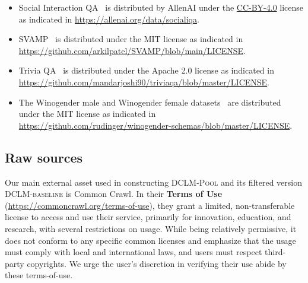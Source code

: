 \documentclass{article}
\newcommand{\rawpool}{\textsc{DCLM-Pool}\xspace}
\newcommand{\hqpool}{\textsc{DCLM-baseline}\xspace}
\newcommand{\commoncrawl}{Common Crawl\xspace}
\begin{document}
\begin{itemize}
    Simple arithmetic with spaces and without spaces~\citep{mosailMLarithmetic} is distributed under the Apache-2.0 through \url{https://github.com/mosaicml/llm-foundry}.
    \item
    Social Interaction QA~\citep{siqa} is distributed by AllenAI under the \href{https://creativecommons.org/licenses/by/4.0/}{CC-BY-4.0} license as indicated in \url{https://allenai.org/data/socialiqa}.
    \item
    SVAMP~\citep{patel2021nlp}  is distributed under the MIT license as indicated in \url{https://github.com/arkilpatel/SVAMP/blob/main/LICENSE}.
    \item
    Trivia QA~\citep{triviaqa} is distributed under the Apache 2.0 license as indicated in \url{https://github.com/mandarjoshi90/triviaqa/blob/master/LICENSE}.
    \item
    The Winogender male and Winogender female datasets~\citep{winogender} are distributed under the MIT license as indicated in \url{https://github.com/rudinger/winogender-schemas/blob/master/LICENSE}.
\end{itemize}


\subsection{Raw sources}
Our main external asset used in constructing \rawpool and its filtered version \hqpool is \commoncrawl \citep{commoncrawl}. In their \textbf{Terms of Use} (\url{https://commoncrawl.org/terms-of-use}), they grant a limited, non-transferable license to access and use their service, primarily for innovation, education, and research, with several restrictions on usage. While being relatively permissive, it does not conform to any specific common licenses and emphasize that the usage must comply with local and international laws, and users must respect third-party copyrights. We urge the user's discretion in verifying their use abide by these terms-of-use.
\end{document}
